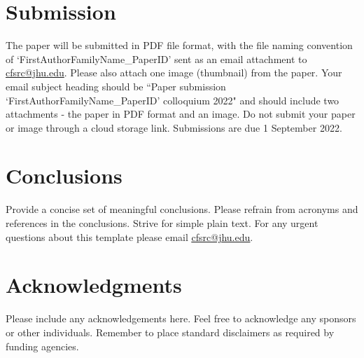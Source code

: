 \documentclass[letter,10pt,twocolumn]{article}
\begin{document}
\section {Submission}
The paper will be submitted in PDF file format, with the file naming convention of `FirstAuthorFamilyName\_PaperID' sent as an email attachment to \href{mailto:cfsrc@jhu.edu}{cfsrc@jhu.edu}. Please also attach one image (thumbnail) from the paper. Your email subject heading should be ``Paper submission `FirstAuthorFamilyName\_PaperID' colloquium 2022" and should include two attachments - the paper in PDF format and an image. Do not submit your paper or image through a cloud storage link. Submissions are due 1 September 2022.


\section{Conclusions}
Provide a concise set of meaningful conclusions. Please refrain from acronyms and references in the conclusions. Strive for simple plain text. For any urgent questions about this template please email \href{mailto:cfsrc@jhu.edu}{\underline{cfsrc@jhu.edu}}.

\section{Acknowledgments}
Please include any acknowledgements here. Feel free to acknowledge any sponsors or other individuals. Remember to place standard disclaimers as required by funding agencies. 

\printbibliography
\end{document}
